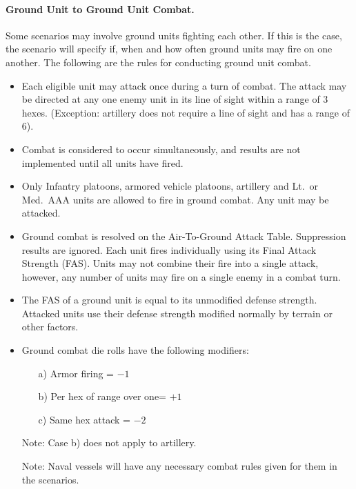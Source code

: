 \paragraph{Ground Unit to Ground Unit Combat.} Some scenarios may involve ground units fighting each other. If this is the case, the scenario will specify if, when and how often ground units may fire on one another. The following are the rules for conducting ground unit combat.
\begin{itemize}

    \item Each eligible unit may attack once during a turn of combat. The attack may be directed at any one enemy unit in its line of sight within a range of 3 hexes. (Exception: artillery does not require a line of sight and has a range of 6).

    \item Combat is considered to occur simultaneously, and results are not implemented until all units have fired.
    
    \item Only Infantry platoons, armored vehicle platoons, artillery and Lt.\ or Med.\ AAA units are allowed to fire in ground combat. Any unit may be attacked.

    \item Ground combat is resolved on the Air-To-Ground Attack Table. Suppression results are ignored. Each unit fires individually using its Final Attack Strength (FAS). Units may not combine their fire into a single attack, however, any number of units may fire on a single enemy in a combat turn.

    \item The FAS of a ground unit is equal to its unmodified defense strength. Attacked units use their defense strength modified normally by terrain or other factors.

    \item Ground combat die rolls have the following modifiers:
    \begin{enumerate}
        \item[a)] Armor firing = $-1$
        \item[b)] Per hex of range over one= $+1$
        \item[c)] Same hex attack = $-2$
    \end{enumerate}

    Note: Case b) does not apply to artillery.

    Note: Naval vessels will have any necessary combat rules given for them in the scenarios. 

\end{itemize}


